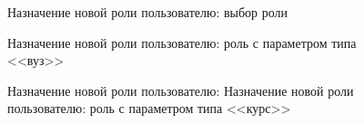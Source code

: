 \begin{figure}[H]
	\caption{Назначение новой роли пользователю: выбор роли}
	\label{img:employee:choose_role}
\end{figure}
\begin{figure}[H]
	\caption{Назначение новой роли пользователю: роль с параметром типа <<вуз>>}
	\label{img:employee:uni_role}
\end{figure}
\begin{figure}[H]
	\caption{Назначение новой роли пользователю: Назначение новой роли пользователю: роль с параметром типа <<курс>>}
	\label{img:employee:course_role}
\end{figure}
